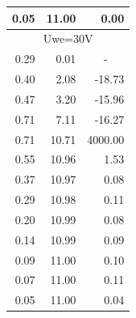 \documentclass[a4paper,12pt]{article}
\begin{document}
\begin{table}[h]
\begin{tabular}{|r|r|r|}
0.05                              & 11.00                           & 0.00                                 \\ \hline
\multicolumn{3}{|c|}{Uwe=30V}                                                                              \\ \hline
0.29                              & 0.01                            & \multicolumn{1}{c|}{-}               \\ \hline
0.40                              & 2.08                            & -18.73                               \\ \hline
0.47                              & 3.20                            & -15.96                               \\ \hline
0.71                              & 7.11                            & -16.27                               \\ \hline
0.71                              & 10.71                           & 4000.00                              \\ \hline
0.55                              & 10.96                           & 1.53                                 \\ \hline
0.37                              & 10.97                           & 0.08                                 \\ \hline
0.29                              & 10.98                           & 0.11                                 \\ \hline
0.20                              & 10.99                           & 0.08                                 \\ \hline
0.14                              & 10.99                           & 0.09                                 \\ \hline
0.09                              & 11.00                           & 0.10                                 \\ \hline
0.07                              & 11.00                           & 0.11                                 \\ \hline
0.05                              & 11.00                           & 0.04                                 \\ \hline
\end{tabular}
\end{table}

\pagebreak
\end{document}
